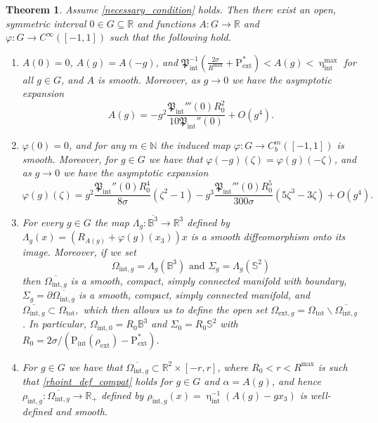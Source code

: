 \documentclass[11pt,reqno]{amsart}
\numberwithin{equation}{section}
\def\p{\partial}
\def\p{\partial}
\newcommand{\m}{\mathrm}
\def\pint{\m{P}_{\m{int}}}
\def\pfint{\mathfrak{P}_{\m{int}}}
\def\hint{\upeta_{\m{int}}}
\def\pext{\m{P}_{\m{ext}}}
\def\N{\mathbb{N}}
\def\R{\mathbb{R}}
\newtheorem{thm}[lem]{Theorem}
\begin{document}
\begin{thm}\label{main_thm}
Assume \eqref{necessary_condition} holds.  Then there exist an open, symmetric interval $0 \in G \subseteq \R$ and functions $A :G  \to \R$ and $\varphi : G \to C^\infty([-1,1])$ such that the following hold.
\begin{enumerate}
 \item $A(0) =0$, $A(g) = A(-g)$, and $\pfint^{-1}\left(\frac{2\sigma}{R^{\m{max}}} + \pext^\ast\right) < A(g) < \hint^{\m{max}}$ for all $g \in G$, and $A$ is smooth.  Moreover, as $g \to 0$ we have the asymptotic expansion
\begin{equation}
 A(g) =  - g^2 \frac{\pfint'''(0)R_0^2 }{ 10\pfint''(0) } + O(g^4).
\end{equation}

 \item $\varphi(0)=0$, and for any $m \in \N$ the induced map $\varphi : G \to C^m_b([-1,1])$ is smooth.  Moreover, for $g \in G$ we have that $\varphi(-g)(\zeta) = \varphi(g)(-\zeta)$, and as $g \to 0$ we have the asymptotic expansion 
\begin{equation}
\varphi(g)(\zeta) = g^2 \frac{\pfint''(0) R_0^4}{8\sigma}(\zeta^2 - 1)  - g^3 \frac{\pfint'''(0) R_0^5}{300\sigma} (5\zeta^3 - 3 \zeta) + O(g^4).
\end{equation}

 
 \item For every $g \in G$ the map $\Lambda_g : \overline{\mathbb{B}^3} \to \R^3$ defined by $\Lambda_g(x) = (R_{A(g)} + \varphi(g)(x_3)) x$ is a smooth diffeomorphism onto its image.  Moreover, if we set
\begin{equation}
 \Omega_{\m{int},g} = \Lambda_g(\mathbb{B}^3) \text{ and } \Sigma_g = \Lambda_g(\mathbb{S}^2) 
\end{equation}
then $\overline{\Omega_{\m{int},g}}$ is a smooth, compact, simply connected manifold with boundary, $\Sigma_g = \p \overline{\Omega_{\m{int},g}}$ is a smooth, compact, simply connected manifold, and $\overline{\Omega_{\m{int},g}} \subset \Omega_{\m{tot}},$ which then allows us to define the open set $\Omega_{\m{ext},g} = \Omega_{\m{tot}} \backslash \overline{\Omega_{\m{int},g}}$.  In particular, $\Omega_{\m{int},0} = R_0 \mathbb{B}^3$ and $\Sigma_0 = R_0 \mathbb{S}^2$ with $R_0 = 2\sigma / (\pint(\rho_{\m{ext}}) - \pext^\ast )$.

 \item For $g \in G$ we have that $\overline{\Omega_{\m{int},g}} \subset \R^2 \times [-r,r]$, where $R_0 < r < R^{\m{max}}$ is  such that \eqref{rhoint_def_compat} holds for $g \in G$ and $\alpha = A(g)$, and hence $\rho_{\m{int},g} : \overline{\Omega_{\m{int},g}} \to \R_+$ defined by $\rho_{\m{int},g}(x)  = \hint^{-1}(A(g) - gx_3)$ is well-defined and smooth.


\end{enumerate}
\end{thm}
\end{document}
